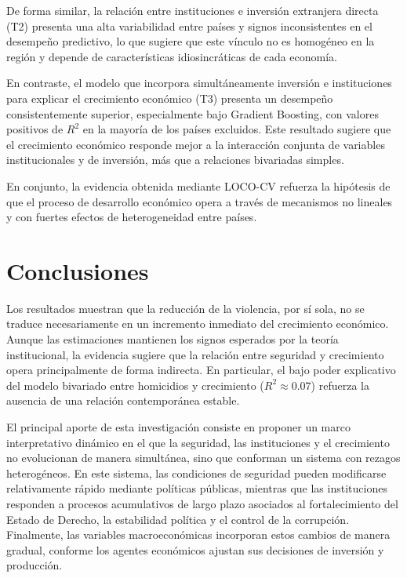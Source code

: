 \documentclass[11pt,a4paper]{article}
\begin{document}
De forma similar, la relación entre instituciones e inversión extranjera directa (T2) presenta una alta variabilidad entre países y signos inconsistentes en el desempeño predictivo, lo que sugiere que este vínculo no es homogéneo en la región y depende de características idiosincráticas de cada economía.

En contraste, el modelo que incorpora simultáneamente inversión e instituciones para explicar el crecimiento económico (T3) presenta un desempeño consistentemente superior, especialmente bajo Gradient Boosting, con valores positivos de $R^2$ en la mayoría de los países excluidos. Este resultado sugiere que el crecimiento económico responde mejor a la interacción conjunta de variables institucionales y de inversión, más que a relaciones bivariadas simples.

En conjunto, la evidencia obtenida mediante LOCO-CV refuerza la hipótesis de que el proceso de desarrollo económico opera a través de mecanismos no lineales y con fuertes efectos de heterogeneidad entre países.
\section*{Conclusiones}

Los resultados muestran que la reducción de la violencia, por sí sola, no se traduce necesariamente en un incremento inmediato del crecimiento económico. Aunque las estimaciones mantienen los signos esperados por la teoría institucional, la evidencia sugiere que la relación entre seguridad y crecimiento opera principalmente de forma indirecta. En particular, el bajo poder explicativo del modelo bivariado entre homicidios y crecimiento ($R^2 \approx 0.07$) refuerza la ausencia de una relación contemporánea estable.

El principal aporte de esta investigación consiste en proponer un marco interpretativo dinámico en el que la seguridad, las instituciones y el crecimiento no evolucionan de manera simultánea, sino que conforman un sistema con rezagos heterogéneos. En este sistema, las condiciones de seguridad pueden modificarse relativamente rápido mediante políticas públicas, mientras que las instituciones responden a procesos acumulativos de largo plazo asociados al fortalecimiento del Estado de Derecho, la estabilidad política y el control de la corrupción. Finalmente, las variables macroeconómicas incorporan estos cambios de manera gradual, conforme los agentes económicos ajustan sus decisiones de inversión y producción.
\end{document}
